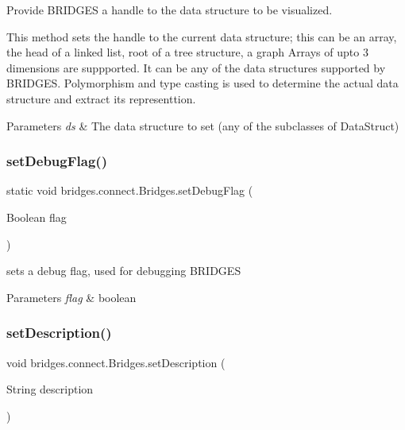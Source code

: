 Provide B\+R\+I\+D\+G\+ES a handle to the data structure to be visualized. 

This method sets the handle to the current data structure; this can be an array, the head of a linked list, root of a tree structure, a graph Arrays of upto 3 dimensions are suppported. It can be any of the data structures supported by B\+R\+I\+D\+G\+ES. Polymorphism and type casting is used to determine the actual data structure and extract its representtion.


\begin{DoxyParams}{Parameters}
{\em ds} & The data structure to set (any of the subclasses of Data\+Struct) \\
\hline
\end{DoxyParams}
\mbox{\label{classbridges_1_1connect_1_1_bridges_a9295b15aa880aa976706ed4f3337fb3b}} 
\subsubsection{\texorpdfstring{set\+Debug\+Flag()}{setDebugFlag()}}
{\footnotesize\ttfamily static void bridges.\+connect.\+Bridges.\+set\+Debug\+Flag (\begin{DoxyParamCaption}\item[{Boolean}]{flag }\end{DoxyParamCaption})\hspace{0.3cm}{\ttfamily [static]}}



sets a debug flag, used for debugging B\+R\+I\+D\+G\+ES 


\begin{DoxyParams}{Parameters}
{\em flag} & boolean \\
\hline
\end{DoxyParams}
\mbox{\label{classbridges_1_1connect_1_1_bridges_a50d1d5aa64d312393b63d1be854e34a2}} 
\subsubsection{\texorpdfstring{set\+Description()}{setDescription()}}
{\footnotesize\ttfamily void bridges.\+connect.\+Bridges.\+set\+Description (\begin{DoxyParamCaption}\item[{String}]{description }\end{DoxyParamCaption})}



